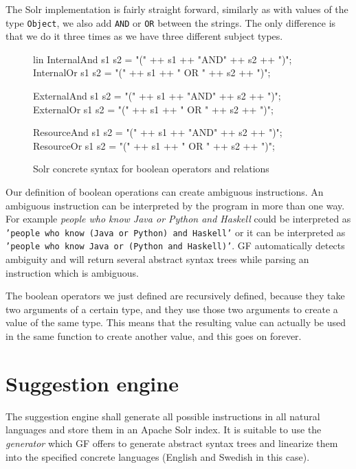 The Solr implementation is fairly straight forward, similarly as with values of the type \texttt{Object}, we also add \texttt{AND} or \texttt{OR} between the strings. The only difference is that we do it three times as we have three different subject types.

\begin{figure}[H]
\begin{code}
lin
  InternalAnd s1 s2 = "(" ++ s1 ++ "AND" ++ s2 ++ ")";
  InternalOr s1 s2 = "(" ++ s1 ++ " OR " ++ s2 ++ ")";

  ExternalAnd s1 s2 = "(" ++ s1 ++ "AND" ++ s2 ++ ")";
  ExternalOr s1 s2 = "(" ++ s1 ++ " OR " ++ s2 ++ ")";

  ResourceAnd s1 s2 = "(" ++ s1 ++ "AND" ++ s2 ++ ")";
  ResourceOr s1 s2 = "(" ++ s1 ++ " OR " ++ s2 ++ ")";
\end{code}
\caption{Solr concrete syntax for boolean operators and relations\label{fig:boolean-solr-relations}}
\end{figure}

Our definition of boolean operations can create ambiguous instructions. An ambiguous instruction can be interpreted by the program in more than one way. For example \emph{people who know Java or Python and Haskell} could be interpreted as \texttt{'people who know (Java or Python) and Haskell'} or it can be interpreted as \texttt{'people who know Java or (Python and Haskell)'}. GF automatically detects ambiguity and will return several abstract syntax trees while parsing an instruction which is ambiguous.

The boolean operators we just defined are recursively defined, because they take two arguments of a certain type, and they use those two arguments to create a value of the same type. This means that the resulting value can actually be used in the same function to create another value, and this goes on forever.

\section{Suggestion engine}
The suggestion engine shall generate all possible instructions in all natural languages and store them in an Apache Solr index. It is suitable to use the \emph{generator} which GF offers to generate abstract syntax trees and linearize them into the specified concrete languages (English and Swedish in this case).

